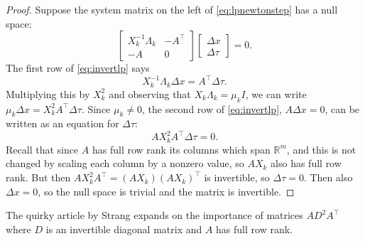 \documentclass[11pt]{article}
\newcommand{\RR}{\mathbb{R}}
\begin{document}
\begin{proof}  Suppose the system matrix on the left of \eqref{eq:lpnewtonstep} has a null space:
\begin{equation}
\begin{bmatrix}
X_k^{-1}\Lambda_k  & -A^\top \\
-A                 & 0
\end{bmatrix}
\begin{bmatrix}
\Delta x \\
\Delta \tau
\end{bmatrix}
= 0. \label{eq:invertlp}
\end{equation}
The first row of \eqref{eq:invertlp} says
    $$X_k^{-1}\Lambda_k \Delta x = A^\top \Delta\tau.$$
Multiplying this by $X_k^2$ and observing that $X_k\Lambda_k = \mu_k I$, we can write $\mu_k\Delta x = X_k^2 A^\top \Delta \tau$.  Since $\mu_k\ne 0$, the second row of \eqref{eq:invertlp}, $A\Delta x=0$, can be written as an equation for $\Delta\tau$:
    $$A X_k^2 A^\top \Delta \tau = 0.$$
Recall that since $A$ has full row rank its columns which span $\RR^m$, and this is not changed by scaling each column by a nonzero value, so $AX_k$ also has full row rank.  But then $A X_k^2 A^\top = (AX_k) (AX_k)^\top$ is invertible, so $\Delta \tau=0$.  Then also $\Delta x=0$, so the null space is trivial and the matrix is invertible.\end{proof}

The quirky article by Strang \cite{Strang1987} expands on the importance of matrices $A D^2 A^\top$ where $D$ is an invertible diagonal matrix and $A$ has full row rank.
\end{document}
